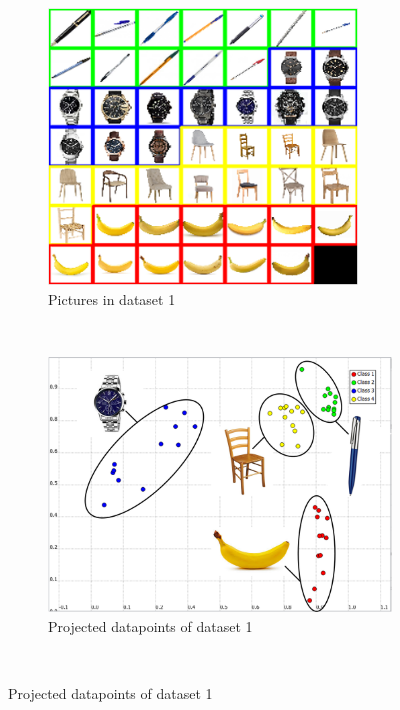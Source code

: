 \documentclass[a4paper,10pt]{article}
\begin{document}
\begin{figure}[H]
\centering
	\begin{subfigure}[t]{0.33\textwidth}
      \centering
      \includegraphics[width=0.9\textwidth]{pictures/dataset_1}
      \caption{Pictures in dataset 1}
      \label{fig:dataset_1}
    \end{subfigure}%
    ~
	\begin{subfigure}[t]{0.33\textwidth}
      \centering
      \includegraphics[width=\textwidth]{pictures/dataset_1_labelized}
      \caption{Projected datapoints of dataset 1}
      \label{fig:dataset_1_labelized}
    \end{subfigure}%
    ~

\end{figure}
\end{document}

